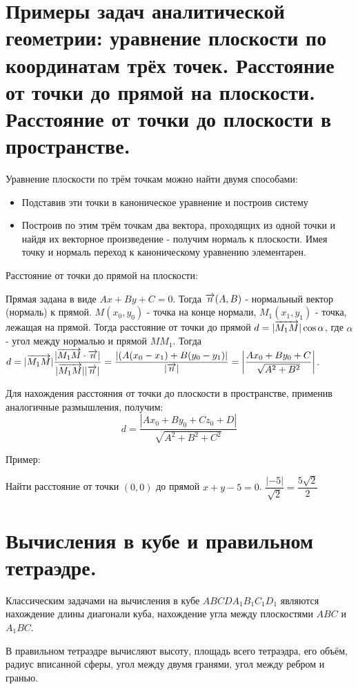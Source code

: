 \documentclass[12pt]{article}
\begin{document}
\begin{sloppypar}
    \section{Примеры задач аналитической геометрии: уравнение плоскости по координатам трёх точек. Расстояние от точки до прямой на плоскости. Расстояние от точки до плоскости в пространстве.}
    Уравнение плоскости по трём точкам можно найти двумя способами:
    \begin{itemize}
        \item Подставив эти точки в каноническое уравнение и построив систему
        \item Построив по этим трём точкам два вектора, проходящих из одной точки и найдя их векторное произведение - получим нормаль к плоскости. Имея точку и нормаль переход к каноническому уравнению элементарен.
    \end{itemize}

    Расстояние от точки до прямой на плоскости:

    Прямая задана в виде $Ax + By + C = 0$. Тогда $\overrightarrow{n} (A, B)$ - нормальный вектор (нормаль) к прямой. $M(x_0, y_0)$ - точка на конце нормали, $M_1(x_1, y_1)$ - точка, лежащая на прямой. Тогда расстояние от точки до прямой $d = |\overrightarrow{M_1M}| \cos \alpha$, где $\alpha$ - угол между нормалью и прямой $MM_1$. Тогда $d = |\overrightarrow{M_1M}|\dfrac{|\overrightarrow{M_1M} \cdot \overrightarrow{n}|}{|\overrightarrow{M_1 M}||\overrightarrow{n}|} = \dfrac{|(A(x_0 - x_1) + B(y_0 - y_1)|}{|\overrightarrow{n}|} = \left|\dfrac{Ax_0 + By_0 + C}{\sqrt{A^2 + B^2}}\right|$.

    Для нахождения расстояния от точки до плоскости в пространстве, применив аналогичные размышления, получим:
    \[
        d = \dfrac{|Ax_0 + By_0 + Cz_0 + D|}{\sqrt{A^2 + B^2 + C^2}}
    \]

    Пример:

    Найти расстояние от точки $(0, 0)$ до прямой $x + y - 5 = 0$. $\dfrac{|-5|}{\sqrt{2}} = \dfrac{5\sqrt{2}}{2}$

    \section{Вычисления в кубе и правильном тетраэдре.}
    Классическим задачами на вычисления в кубе $ABCDA_1B_1C_1D_1$ являются нахождение длины диагонали куба, нахождение угла между плоскостями $ABC$ и $A_1BC$.

    В правильном тетраэдре вычисляют высоту, площадь всего тетраэдра, его объём, радиус вписанной сферы, угол между двумя гранями, угол между ребром и гранью.


\end{sloppypar}
\end{document}
